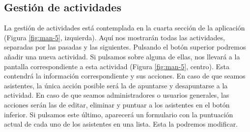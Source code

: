 \subsection{Gestión de actividades}

La gestión de actividades está contemplada en la cuarta sección de la aplicación (Figura \ref{fig:man-5}, izquierda). Aquí nos mostrarán todas las actividades, separadas por las pasadas y las siguientes. Pulsando el botón superior podremos añadir una nueva actividad. Si pulsamos sobre alguna de ellas, nos llevará a la pantalla correspondiente a esta actividad (Figura \ref{fig:man-5}, centro). Esta contendrá la información correspondiente y sus acciones. En caso de que seamos asistentes, la única acción posible será la de apuntarse y desapuntarse a la actividad. En caso de que seamos administradores o usuarios generales, las acciones serán las de editar, eliminar y puntuar a los asistentes en el botón inferior. Si pulsamos este último, aparecerá un formulario con la puntuación actual de cada uno de los asistentes en una lista. Esta la podremos modificar.

